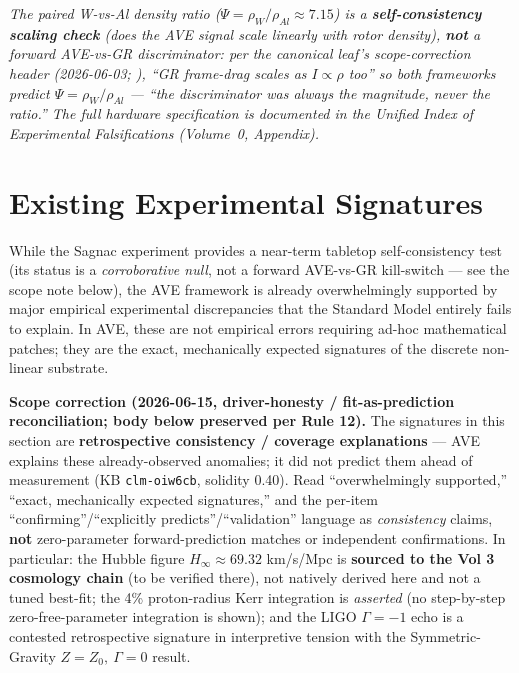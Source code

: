\textit{The paired W-vs-Al density ratio ($\Psi = \rho_W/\rho_{Al} \approx 7.15$) is a \textbf{self-consistency scaling check} (does the AVE signal scale linearly with rotor density), \textbf{not} a forward AVE-vs-GR discriminator: per the canonical leaf's scope-correction header (2026-06-03; ), ``GR frame-drag scales as $I \propto \rho$ too'' so both frameworks predict $\Psi = \rho_W/\rho_{Al}$ --- ``the discriminator was always the magnitude, never the ratio.'' The full hardware specification is documented in the Unified Index of Experimental Falsifications (Volume~0, Appendix).}

\section{Existing Experimental Signatures}

While the Sagnac experiment provides a near-term tabletop self-consistency test (its status is a \emph{corroborative null}, not a forward AVE-vs-GR kill-switch --- see the scope note below), the AVE framework is already overwhelmingly supported by major empirical experimental discrepancies that the Standard Model entirely fails to explain. In AVE, these are not empirical errors requiring ad-hoc mathematical patches; they are the exact, mechanically expected signatures of the discrete non-linear substrate.

\noindent\textbf{Scope correction (2026-06-15, driver-honesty / fit-as-prediction reconciliation; body below preserved per Rule 12).} The signatures in this section are \textbf{retrospective consistency / coverage explanations} --- AVE explains these already-observed anomalies; it did not predict them ahead of measurement (KB \texttt{clm-oiw6cb}, solidity 0.40). Read ``overwhelmingly supported,'' ``exact, mechanically expected signatures,'' and the per-item ``confirming''/``explicitly predicts''/``validation'' language as \emph{consistency} claims, \textbf{not} zero-parameter forward-prediction matches or independent confirmations. In particular: the Hubble figure $H_\infty \approx 69.32$ km/s/Mpc is \textbf{sourced to the Vol 3 cosmology chain} (to be verified there), not natively derived here and not a tuned best-fit; the 4\% proton-radius Kerr integration is \emph{asserted} (no step-by-step zero-free-parameter integration is shown); and the LIGO $\Gamma=-1$\gammaundeclared{} echo is a contested retrospective signature in interpretive tension with the Symmetric-Gravity $Z=Z_0,\ \Gamma=0$ result.

